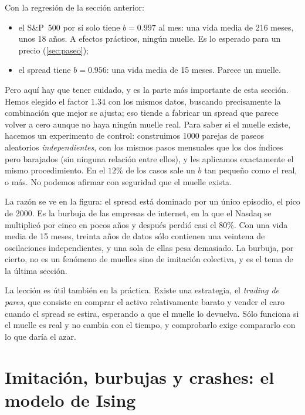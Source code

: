 \documentclass[11pt,a4paper]{article}
\begin{document}
Con la regresión de la sección anterior:
\begin{itemize}
\item el S\&P~500 por sí solo tiene $b=0.997$ al mes: una vida media de 216 meses, unos 18 años. A efectos
prácticos, ningún muelle. Es lo esperado para un precio (\cref{sec:paseo});
\item el spread tiene $b=0.956$: una vida media de 15 meses. Parece un muelle.
\end{itemize}

Pero aquí hay que tener cuidado, y es la parte más importante de esta sección. Hemos elegido el factor
$1.34$ con los mismos datos, buscando precisamente la combinación que mejor se ajusta; eso tiende a
fabricar un spread que parece volver a cero aunque no haya ningún muelle real. Para saber si el muelle
existe, hacemos un experimento de control: construimos 1000 parejas de paseos aleatorios
\emph{independientes}, con los mismos pasos mensuales que los dos índices pero barajados (sin ninguna
relación entre ellos), y les aplicamos exactamente el mismo procedimiento. En el $12\%$ de los casos sale un
$b$ tan pequeño como el real, o más. No podemos afirmar con seguridad que el muelle exista.

La razón se ve en la figura: el spread está dominado por un único episodio, el pico de 2000. Es la burbuja
de las empresas de internet, en la que el Nasdaq se multiplicó por cinco en pocos años y después perdió casi
el $80\%$. Con una vida media de 15 meses, treinta años de datos sólo contienen una veintena de
oscilaciones independientes, y una sola de ellas pesa demasiado. La burbuja, por cierto, no es un fenómeno
de muelles sino de imitación colectiva, y es el tema de la última sección.

La lección es útil también en la práctica. Existe una estrategia, el \emph{trading de pares}, que consiste
en comprar el activo relativamente barato y vender el caro cuando el spread se estira, esperando a que el
muelle lo devuelva. Sólo funciona si el muelle es real y no cambia con el tiempo, y comprobarlo exige
compararlo con lo que daría el azar.

\section{Imitación, burbujas y crashes: el modelo de Ising}
\label{sec:ising}
\end{document}
